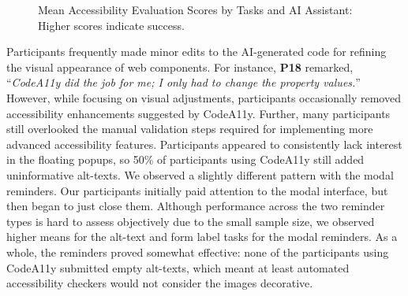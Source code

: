 \begin{figure}
\caption{Mean Accessibility Evaluation Scores by Tasks and AI Assistant: Higher scores indicate success.}
\label{sec-eval}
\end{figure}


Participants frequently made minor edits to the AI-generated code for refining the visual appearance of web components. For instance, \textbf{P18} remarked, ``\textit{CodeA11y did the job for me; I only had to change the property values.}'' However, while focusing on visual adjustments, participants occasionally removed accessibility enhancements suggested by CodeA11y. Further, many participants still overlooked the manual validation steps required for implementing more advanced accessibility features.
Participants appeared to consistently lack interest in the floating popups, so 50\% of participants using CodeA11y still added uninformative alt-texts. We observed a slightly different pattern with the modal reminders. Our participants initially paid attention to the modal interface, but then began to just close them. Although performance across the two reminder types is hard to assess objectively due to the small sample size, we observed higher means for the alt-text and form label tasks for the modal reminders. As a whole, the reminders proved somewhat effective: none of the participants using CodeA11y submitted empty alt-texts, which meant at least automated accessibility checkers would not consider the images decorative.


